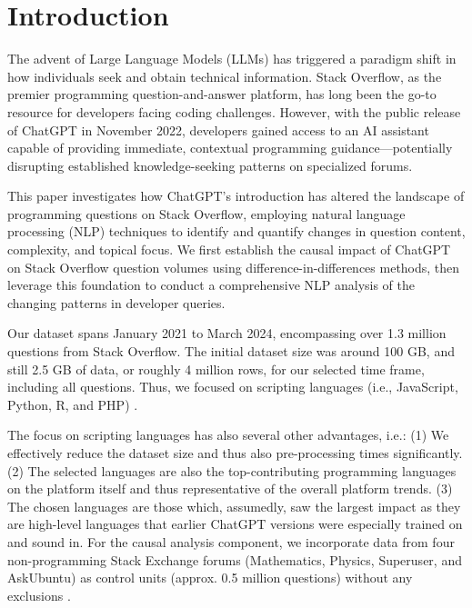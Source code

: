 \section{Introduction}
The advent of Large Language Models (LLMs) has triggered a paradigm shift in how individuals seek and obtain technical information. Stack Overflow, as the premier programming question-and-answer platform, has long been the go-to resource for developers facing coding challenges. However, with the public release of ChatGPT in November 2022, developers gained access to an AI assistant capable of providing immediate, contextual programming guidance—potentially disrupting established knowledge-seeking patterns on specialized forums.

This paper investigates how ChatGPT's introduction has altered the landscape of programming questions on Stack Overflow, employing natural language processing (NLP) techniques to identify and quantify changes in question content, complexity, and topical focus. We first establish the causal impact of ChatGPT on Stack Overflow question volumes using difference-in-differences methods, then leverage this foundation to conduct a comprehensive NLP analysis of the changing patterns in developer queries.

Our dataset spans January 2021 to March 2024, encompassing over 1.3 million questions from Stack Overflow. The initial dataset size was around 100 GB, and still 2.5 GB of data, or roughly 4 million rows, for our selected time frame, including all questions. Thus, we focused on scripting languages (i.e., JavaScript, Python, R, and PHP) \parencite{stack_overflow_tags_nodate}.

The focus on scripting languages has also several other advantages, i.e.: (1) We effectively reduce the dataset size and thus also pre-processing times significantly. (2) The selected languages are also the top-contributing programming languages on the platform itself and thus representative of the overall platform trends. (3) The chosen languages are those which, assumedly, saw the largest impact as they are high-level languages that earlier ChatGPT versions were especially trained on and sound in. For the causal analysis component, we incorporate data from four non-programming Stack Exchange forums (Mathematics, Physics, Superuser, and AskUbuntu) as control units (approx. 0.5 million questions) without any exclusions \parencite{internet_archive_stackexchange_2024}.


